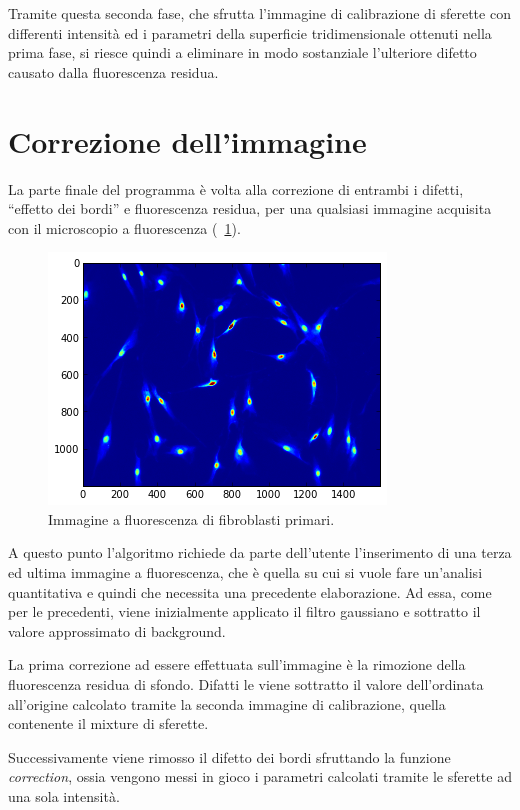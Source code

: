 Tramite questa seconda fase, che sfrutta l'immagine di calibrazione di sferette con differenti intensità ed i parametri della superficie tridimensionale ottenuti nella prima fase, si riesce quindi a eliminare in modo sostanziale l'ulteriore difetto causato dalla fluorescenza residua. 

\section{Correzione dell'immagine}

La parte finale del programma è volta alla correzione di entrambi i difetti, ``effetto dei bordi'' e fluorescenza residua, per una qualsiasi immagine acquisita con il microscopio a fluorescenza (\figurename~\ref{fig:cell}). 

\begin{figure}
 \centering
 \includegraphics[scale=1]{img/CAP3cell.png}
 \caption{\small{Immagine a fluorescenza di fibroblasti primari.}}
 \label{fig:cell}
\end{figure}

A questo punto l'algoritmo richiede da parte dell'utente l'inserimento di una terza ed ultima immagine a fluorescenza, che è quella su cui si vuole fare un'analisi quantitativa e quindi che necessita una precedente elaborazione.
Ad essa, come per le precedenti, viene inizialmente applicato il filtro gaussiano e sottratto il valore approssimato di background.

La prima correzione ad essere effettuata sull'immagine è la rimozione della fluorescenza residua di sfondo. 
Difatti le viene sottratto il valore dell'ordinata all'origine calcolato tramite la seconda immagine di calibrazione,  quella contenente il mixture di sferette.

Successivamente viene rimosso il difetto dei bordi sfruttando la funzione \textit{correction}, ossia vengono messi in gioco i parametri calcolati tramite le sferette ad una sola intensità.

